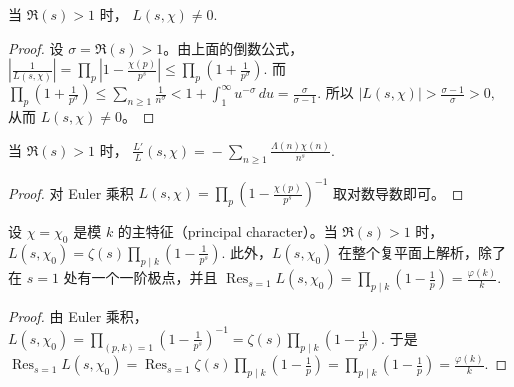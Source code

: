 \begin{corollary}
	当 $\Re(s)>1$ 时，
	\(\textstyle L(s,\allowbreak{}\chi)\neq\allowbreak{} 0.\)
\end{corollary}

\begin{proof}
	设 $\sigma=\Re(s)>1$。由上面的倒数公式，
	\(\textstyle \left|\frac{1}{L(s,\allowbreak{}\chi)}\right| =\allowbreak{} \prod_p\left|1-\frac{\chi(p)}{p^s}\right| \leq\allowbreak{} \prod_p\left(1+\allowbreak{}\frac{1}{p^\sigma}\right).\)
	而
	\(\textstyle \prod_p\left(1+\allowbreak{}\frac{1}{p^\sigma}\right) \leq\allowbreak{} \sum_{n\geq\allowbreak{} 1}\frac{1}{n^\sigma} < 1+\allowbreak{}\int_1^\infty u^{-\sigma}\,du =\allowbreak{} \frac{\sigma}{\sigma-1}.\)
	所以
	\(\textstyle |L(s,\allowbreak{}\chi)|>\frac{\sigma-1}{\sigma}>0,\allowbreak{}\)
	从而 $L(s,\chi)\neq 0$。
\end{proof}

\begin{corollary}
	当 $\Re(s)>1$ 时，
	\(\textstyle \frac{L'}{L}(s,\allowbreak{}\chi) =\allowbreak{} -\sum_{n\geq\allowbreak{} 1}\frac{\Lambda(n)\chi(n)}{n^s}.\)
\end{corollary}

\begin{proof}
	对 Euler 乘积
	\(\textstyle L(s,\allowbreak{}\chi)=\allowbreak{}\prod_p\left(1-\frac{\chi(p)}{p^s}\right)^{-1}\)
	取对数导数即可。
\end{proof}

\begin{lemma}
	设 $\chi=\chi_0$ 是模 $k$ 的主特征（principal character）。当 $\Re(s)>1$ 时，
	\(\textstyle L(s,\allowbreak{}\chi_0)=\allowbreak{}\zeta(s)\prod_{p\mid\allowbreak{} k}\left(1-\frac{1}{p^s}\right).\)
	此外，$L(s,\chi_0)$ 在整个复平面上解析，除了在 $s=1$ 处有一个一阶极点，并且
	\(\textstyle \operatorname{Res}_{s=\allowbreak{}1}L(s,\allowbreak{}\chi_0) =\allowbreak{} \prod_{p\mid\allowbreak{} k}\left(1-\frac{1}{p}\right) =\allowbreak{} \frac{\varphi(k)}{k}.\)
\end{lemma}

\begin{proof}
	由 Euler 乘积，
	\(\textstyle L(s,\allowbreak{}\chi_0) =\allowbreak{} \prod_{(p,\allowbreak{}k)=\allowbreak{}1}\left(1-\frac{1}{p^s}\right)^{-1} =\allowbreak{} \zeta(s)\prod_{p\mid\allowbreak{} k}\left(1-\frac{1}{p^s}\right).\)
	于是
	\(\textstyle \operatorname{Res}_{s=\allowbreak{}1}L(s,\allowbreak{}\chi_0) =\allowbreak{} \operatorname{Res}_{s=\allowbreak{}1}\zeta(s) \prod_{p\mid\allowbreak{} k}\left(1-\frac{1}{p}\right) =\allowbreak{} \prod_{p\mid\allowbreak{} k}\left(1-\frac{1}{p}\right) =\allowbreak{} \frac{\varphi(k)}{k}.\)
\end{proof}

